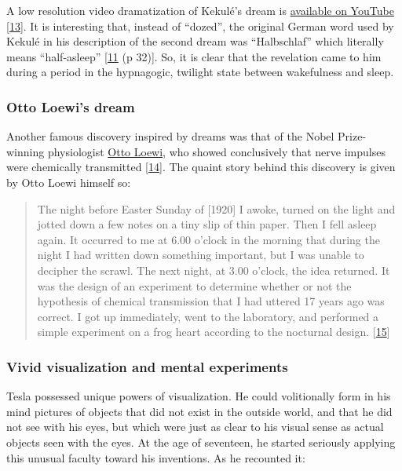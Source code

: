 \documentclass[
  a4paper,
]{article}
\begin{document}
A low resolution video dramatization of Kekulé's dream is
\href{https://www.youtube.com/watch?v=2NRwd-JJFm4}{available on YouTube}
{[}\protect\hyperlink{ref-kekules-dream}{13}{]}. It is interesting that,
instead of ``dozed'', the original German word used by Kekulé in his
description of the second dream was ``Halbschlaf'' which literally means
``half-asleep'' {[}\protect\hyperlink{ref-weisberg86}{11} (p 32){]}. So,
it is clear that the revelation came to him during a period in the
hypnagogic, twilight state between wakefulness and sleep.

\hypertarget{otto-loewis-dream}{%
\subsubsection{Otto Loewi's dream}\label{otto-loewis-dream}}

Another famous discovery inspired by dreams was that of the Nobel
Prize-winning physiologist
\href{https://en.wikipedia.org/wiki/Otto_Loewi}{Otto Loewi}, who showed
conclusively that nerve impulses were chemically transmitted
{[}\protect\hyperlink{ref-justin06}{14}{]}. The quaint story behind this
discovery is given by Otto Loewi himself so:

\begin{quote}
The night before Easter Sunday of {[}1920{]} I awoke, turned on the
light and jotted down a few notes on a tiny slip of thin paper. Then I
fell asleep again. It occurred to me at 6.00 o'clock in the morning that
during the night I had written down something important, but I was
unable to decipher the scrawl. The next night, at 3.00 o'clock, the idea
returned. It was the design of an experiment to determine whether or not
the hypothesis of chemical transmission that I had uttered 17 years ago
was correct. I got up immediately, went to the laboratory, and performed
a simple experiment on a frog heart according to the nocturnal design.
{[}\protect\hyperlink{ref-loewi2014}{15}{]}
\end{quote}

\hypertarget{vivid-visualization-and-mental-experiments}{%
\subsubsection{Vivid visualization and mental
experiments}\label{vivid-visualization-and-mental-experiments}}

Tesla possessed unique powers of visualization. He could volitionally
form in his mind pictures of objects that did not exist in the outside
world, and that he did not see with his eyes, but which were just as
clear to his visual sense as actual objects seen with the eyes. At the
age of seventeen, he started seriously applying this unusual faculty
toward his inventions. As he recounted it:
\end{document}
